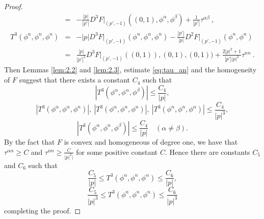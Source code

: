 \documentclass[12pt]{article}
\numberwithin{equation}{section}
\theoremstyle{plain}
\theoremstyle{definition}
\theoremstyle{remark}
\begin{document}
\begin{proof}
\begin{eqnarray*}
    & = &  - \frac{|p|}{|p'|} D^3 F\Big|_{(p',-1)} ((0,1),\phi^{\alpha}, \phi^{\beta}) + \frac{1}{|p'|} \tau^{\alpha \beta} \ , \\
   T^3 (\phi^{n}, \phi^{n}, \phi^n) & = &  -|p| D^3 F\Big|_{(p',-1)} (\phi^n, \phi^n, \phi^n ) - \frac{|p'|}{|p|} D^2 F\Big|_{(p',-1)} (\phi^n, \phi^n ) \\
   & = & \frac{|p|}{|p'|^3} D^3 F\Big|_{(p',-1)} ((0,1)), (0,1), (0,1)) + \frac{2|p|^2 + 1}{|p'| |p|^2} \tau^{n n} \ . 
\end{eqnarray*}
Then Lemmas \ref{lem:2.2} and \ref{lem:2.3}, estimate \eqref{eq:tau_an} and the
homogeneity of $F$ suggest that there exists a constant $C_4$ such that 
\begin{equation*}
    |T^3 (\phi^{\alpha}, \phi^{\alpha}, \phi^{\beta})| \leq \frac{C_4}{|p|},
\end{equation*}
\begin{equation*}
     |T^3 (\phi^{\alpha}, \phi^{\alpha}, \phi^{n})|,\ |T^3 (\phi^{\alpha}, \phi^n, \phi^n)|, \ |T^3 (\phi^{n}, \phi^{n}, \phi^{\alpha})| \leq \frac{C_4}{|p|^3},
\end{equation*}
\begin{equation*}
    | T^3 (\phi^{\alpha}, \phi^n, \phi^{\beta})| \leq \frac{C_4}{|p|} \quad (\alpha\neq \beta).
\end{equation*}
By the fact that $F$ is convex and homogeneous of degree one, we have that 
$ \tau^{\alpha \alpha}\geq C$ and $\tau^{n n}\geq \frac{C}{|p|^2|}$ for some positive constant $C$.
Hence there are constants $C_5$ and $C_6$ such that
\begin{equation*}
    \frac{C_5}{|p|} \leq T^3 (\phi^{\alpha}, \phi^n, \phi^{\alpha}) \leq \frac{C_6}{|p|},
\end{equation*}
\begin{equation*}
    \frac{C_5}{|p|^3} \leq T^3 (\phi^{n}, \phi^{n}, \phi^n)  \leq \frac{C_6}{|p|^3}
\end{equation*}
completing the proof.
\end{proof}
\end{document}
